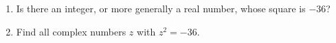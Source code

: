 \begin{enumerate}
\item[(a)] Is there an integer, or more generally a real number, whose square is $-36$?
\item[(b)] Find all complex numbers $z$ with $z^2=-36$.
\end{enumerate}
